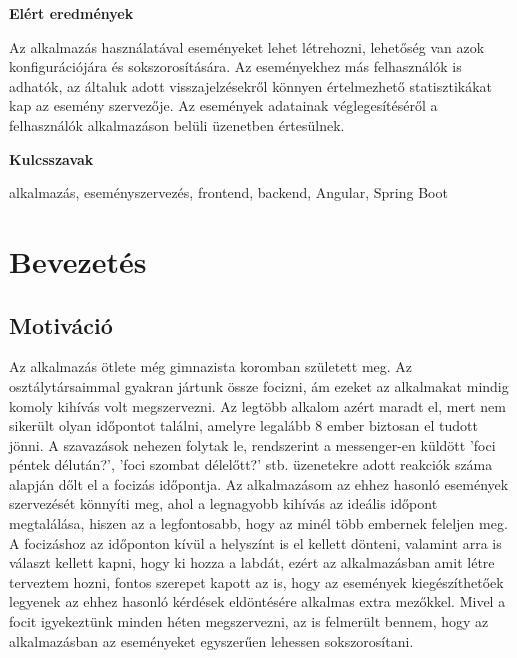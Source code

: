 \documentclass[a4paper,12pt]{report}
\theoremstyle{definition}
\theoremstyle{remark}
\begin{document}
\bigskip

{\bf Elért eredmények}

\medskip

Az alkalmazás használatával eseményeket lehet létrehozni, lehetőség van azok konfigurációjára és sokszorosítására. Az eseményekhez más felhasználók is adhatók, az általuk adott visszajelzésekről könnyen értelmezhető statisztikákat kap az esemény szervezője. Az események adatainak véglegesítéséről a felhasználók alkalmazáson belüli üzenetben értesülnek.

\bigskip

{\bf Kulcsszavak}

\medskip

alkalmazás, eseményszervezés, frontend, backend, Angular, Spring Boot


\newpage

\pagebreak

\tableofcontents
\pagebreak


\chapter{Bevezetés}

\section{Motiváció}

Az alkalmazás ötlete még gimnazista koromban született meg. Az osztálytársaimmal gyakran jártunk össze focizni, ám ezeket az alkalmakat mindig komoly kihívás volt megszervezni. Az legtöbb alkalom azért maradt el, mert nem sikerült olyan időpontot találni, amelyre legalább 8 ember biztosan el tudott jönni. A szavazások nehezen folytak le, rendszerint a messenger-en küldött 'foci péntek délután?', 'foci szombat délelőtt?' stb. üzenetekre adott reakciók száma alapján dőlt el a focizás időpontja. Az alkalmazásom az ehhez hasonló események szervezését könnyíti meg, ahol a legnagyobb kihívás az ideális időpont megtalálása, hiszen az a legfontosabb, hogy az minél több embernek feleljen meg. A focizáshoz az időponton kívül a helyszínt is el kellett dönteni, valamint arra is választ kellett kapni, hogy ki hozza a labdát, ezért az alkalmazásban amit létre terveztem hozni, fontos szerepet kapott az is, hogy az események kiegészíthetőek legyenek az ehhez hasonló kérdések eldöntésére alkalmas extra mezőkkel. Mivel a focit igyekeztünk minden héten megszervezni, az is felmerült bennem, hogy az alkalmazásban az eseményeket egyszerűen lehessen sokszorosítani.
\end{document}
